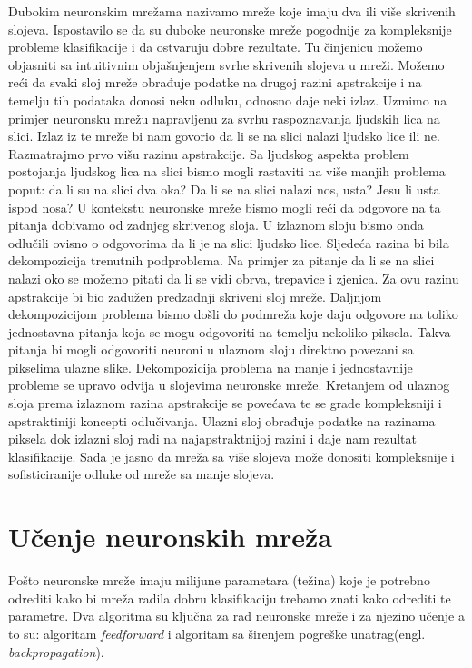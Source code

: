 \documentclass[times, utf8, zavrsni]{fer}
\begin{document}
Dubokim neuronskim mrežama nazivamo mreže koje imaju dva ili više skrivenih slojeva. Ispostavilo se da su duboke neuronske mreže pogodnije za kompleksnije probleme klasifikacije i da ostvaruju dobre rezultate. Tu činjenicu možemo objasniti sa intuitivnim objašnjenjem svrhe skrivenih slojeva u mreži. Možemo reći da svaki sloj mreže obrađuje podatke na drugoj razini apstrakcije i na temelju tih podataka donosi neku odluku, odnosno daje neki izlaz. Uzmimo na primjer neuronsku mrežu napravljenu za svrhu raspoznavanja ljudskih lica na slici. Izlaz iz te mreže bi nam govorio da li se na slici nalazi ljudsko lice ili ne. Razmatrajmo prvo višu razinu apstrakcije. Sa ljudskog aspekta problem postojanja ljudskog lica na slici bismo mogli rastaviti na više manjih problema poput: da li su na slici dva oka? Da li se na slici nalazi nos, usta? Jesu li usta ispod nosa? U kontekstu neuronske mreže bismo mogli reći da odgovore na ta pitanja dobivamo od zadnjeg skrivenog sloja. U izlaznom sloju bismo onda odlučili ovisno o odgovorima da li je na slici ljudsko lice. Sljedeća razina bi bila dekompozicija trenutnih podproblema. Na primjer za pitanje da li se na slici nalazi oko se možemo pitati da li se vidi obrva, trepavice i zjenica. Za ovu razinu apstrakcije bi bio zadužen predzadnji skriveni sloj mreže. Daljnjom dekompozicijom problema bismo došli do podmreža koje daju odgovore na toliko jednostavna pitanja koja se mogu odgovoriti na temelju nekoliko piksela. Takva pitanja bi mogli odgovoriti neuroni u ulaznom sloju direktno povezani sa pikselima ulazne slike. Dekompozicija problema na manje i jednostavnije probleme se upravo odvija u slojevima neuronske mreže. Kretanjem od ulaznog sloja prema izlaznom razina apstrakcije se povećava te se grade kompleksniji i apstraktiniji koncepti odlučivanja. Ulazni sloj obrađuje podatke na razinama piksela dok izlazni sloj radi na najapstraktnijoj razini i daje nam rezultat klasifikacije. Sada je jasno da mreža sa više slojeva može donositi kompleksnije i sofisticiranije odluke od mreže sa manje slojeva.

\section{Učenje neuronskih mreža}
Pošto neuronske mreže imaju milijune parametara (težina) koje je potrebno odrediti kako bi mreža radila dobru klasifikaciju trebamo znati kako odrediti te parametre. Dva algoritma su ključna za rad neuronske mreže i za njezino učenje a to su: algoritam \textit{feedforward} i algoritam sa širenjem pogreške unatrag(engl. \textit{backpropagation}).
\end{document}
